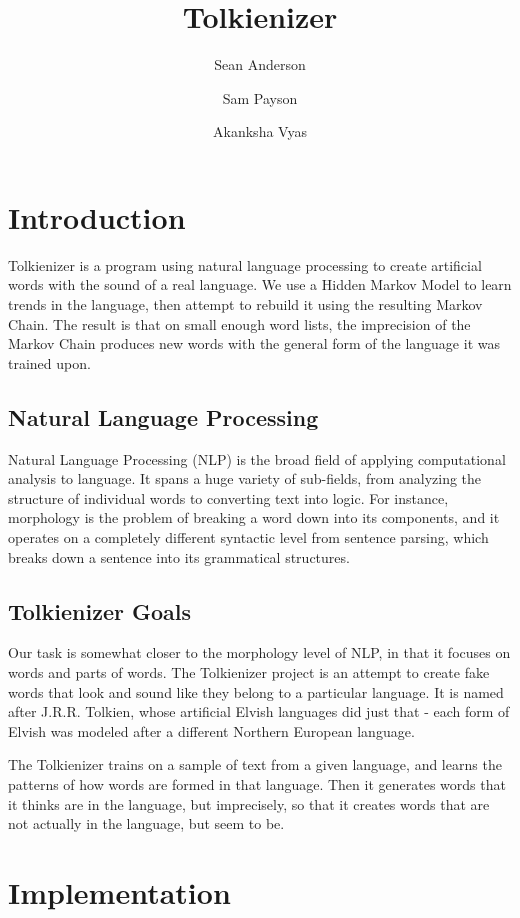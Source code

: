 \documentclass[10pt]{article}
\begin{document}
\title{Tolkienizer}
\author{Sean Anderson \and Sam Payson \and Akanksha Vyas}

\section{Introduction}

Tolkienizer is a program using natural language processing to create artificial
words with the sound of a real language.  We use a Hidden Markov Model to learn
trends in the language, then attempt to rebuild it using the resulting Markov
Chain.  The result is that on small enough word lists, the imprecision of the
Markov Chain produces new words with the general form of the language it was
trained upon.

\subsection{Natural Language Processing}

Natural Language Processing (NLP) is the broad field of applying computational
analysis to language.  It spans a huge variety of sub-fields, from analyzing
the structure of individual words to converting text into logic.  For instance,
morphology is the problem of breaking a word down into its components, and it
operates on a completely different syntactic level from sentence parsing, which
breaks down a sentence into its grammatical structures.

\subsection{Tolkienizer Goals}

Our task is somewhat closer to the morphology level of NLP, in that it focuses
on words and parts of words.  The Tolkienizer project is an attempt to create
fake words that look and sound like they belong to a particular language.  It
is named after J.R.R. Tolkien, whose artificial Elvish languages did just that
- each form of Elvish was modeled after a different Northern European language.

The Tolkienizer trains on a sample of text from a given language, and learns
the patterns of how words are formed in that language.  Then it generates words
that it thinks are in the language, but imprecisely, so that it creates words
that are not actually in the language, but seem to be.

\section{Implementation}
\end{document}
